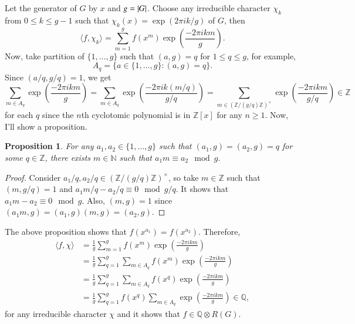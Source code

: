 \documentclass[a4paper, 12pt]{article}
\theoremstyle{Mydefinition}
\theoremstyle{Mytheorem}
\newtheorem{proposition}[statement]{Proposition}
\begin{document}
Let the generator of $G$ by $x$ and $g=\abs{G}$. Choose any irreducible character $\chi_k$ from $0\leq k\leq g-1$ such that $\chi_k(x) = \exp(2\pi i k/g)$ of $G$, then
\begin{equation}
    \langle f, \chi_k\rangle = \sum_{m=1}^{g}f(x^m)\exp\left(\frac{-2\pi ikm}{g}\right).
\end{equation}
Now, take partition of $\{1, \ldots, g\}$ such that $(a, g)=q$ for $1\leq q\leq g$, for example, 
\begin{equation}
    A_q = \{a\in \{1, \ldots, g\}: (a,g)=q\}.
\end{equation}
Since $(a/q, g/q)=1$, we get
\begin{equation}
    \sum_{m\in A_q}\exp\left(\frac{-2\pi ikm}{g}\right) = \sum_{m\in A_q}\exp\left(\frac{-2\pi ik(m/q)}{g/q}\right) = \sum_{m\in (\mathbb{Z}/(g/q)\mathbb{Z})^\times}\exp\left(\frac{-2\pi ikm}{g/q}\right) \in \mathbb{Z}
\end{equation}
for each $q$ since the $n$th cyclotomic polynomial is in $\mathbb{Z}[x]$ for any $n\geq 1$. Now, I'll show a proposition.
\begin{proposition}
For any $a_1,a_2\in\{1, \ldots, g\}$ such that $(a_1,g)=(a_2,g)=q$ for some $q\in\mathbb{Z}$, there exists $m\in\mathbb{N}$ such that $a_1m\equiv a_2\mod g$.
\end{proposition}
\begin{proof}
Consider $a_1/q,a_2/q\in (\mathbb{Z}/(g/q)\mathbb{Z})^\times$, so take $m\in \mathbb{Z}$ such that $(m,g/q)=1$ and $a_1m/q-a_2/q\equiv 0\mod g/q$. It shows that $a_1m-a_2\equiv 0\mod g$. Also, $(m,g)=1$ since $(a_1m,g)=(a_1,g)(m,g)=(a_2,g)$.
\end{proof}
The above proposition shows that $f(x^{a_1})=f(x^{a_2})$. Therefore,
\begin{equation}
\begin{split}
    \langle f, \chi\rangle &= \frac{1}{g}\sum_{m=1}^{g}f(x^m)\exp\left(\frac{-2\pi ikm}{g}\right)\\
    &=\frac{1}{g}\sum_{q=1}^{g}\sum_{m\in A_q}f(x^m)\exp\left(\frac{-2\pi ikm}{g}\right)\\
    &=\frac{1}{g}\sum_{q=1}^{g}\sum_{m\in A_q}f(x^q)\exp\left(\frac{-2\pi ikm}{g}\right)\\
    &=\frac{1}{g}\sum_{q=1}^{g}f(x^q)\sum_{m\in A_q}\exp\left(\frac{-2\pi ikm}{g}\right)\in\mathbb{Q},
\end{split}
\end{equation}
for any irreducible character $\chi$ and it shows that $f\in\mathbb{Q}\otimes R(G)$.
\end{document}
